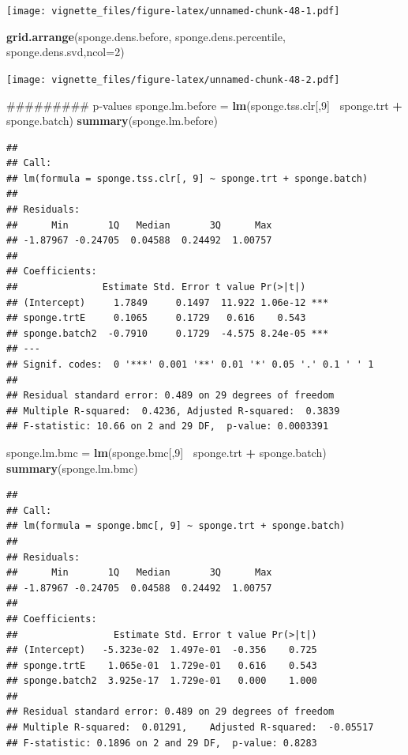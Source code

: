 \documentclass[]{book}
\newenvironment{Shaded}{\begin{snugshade}}{\end{snugshade}}
\newcommand{\KeywordTok}[1]{\textcolor[rgb]{0.13,0.29,0.53}{\textbf{#1}}}
\newcommand{\DataTypeTok}[1]{\textcolor[rgb]{0.13,0.29,0.53}{#1}}
\newcommand{\DecValTok}[1]{\textcolor[rgb]{0.00,0.00,0.81}{#1}}
\newcommand{\StringTok}[1]{\textcolor[rgb]{0.31,0.60,0.02}{#1}}
\newcommand{\OperatorTok}[1]{\textcolor[rgb]{0.81,0.36,0.00}{\textbf{#1}}}
\newcommand{\NormalTok}[1]{#1}
\begin{document}
\texttt{[image: vignette\_files/figure-latex/unnamed-chunk-48-1.pdf]}

\begin{Shaded}
\begin{Highlighting}[]
\KeywordTok{grid.arrange}\NormalTok{(sponge.dens.before, sponge.dens.percentile, sponge.dens.svd,}\DataTypeTok{ncol=}\DecValTok{2}\NormalTok{)}
\end{Highlighting}
\end{Shaded}

\texttt{[image: vignette\_files/figure-latex/unnamed-chunk-48-2.pdf]}

\begin{Shaded}
\begin{Highlighting}[]
\NormalTok{######### p-values}
\NormalTok{sponge.lm.before =}\StringTok{ }\KeywordTok{lm}\NormalTok{(sponge.tss.clr[,}\DecValTok{9}\NormalTok{]}\OperatorTok{~}\StringTok{ }\NormalTok{sponge.trt }\OperatorTok{+}\StringTok{ }\NormalTok{sponge.batch)}
\KeywordTok{summary}\NormalTok{(sponge.lm.before)}
\end{Highlighting}
\end{Shaded}

\begin{verbatim}
## 
## Call:
## lm(formula = sponge.tss.clr[, 9] ~ sponge.trt + sponge.batch)
## 
## Residuals:
##      Min       1Q   Median       3Q      Max 
## -1.87967 -0.24705  0.04588  0.24492  1.00757 
## 
## Coefficients:
##               Estimate Std. Error t value Pr(>|t|)    
## (Intercept)     1.7849     0.1497  11.922 1.06e-12 ***
## sponge.trtE     0.1065     0.1729   0.616    0.543    
## sponge.batch2  -0.7910     0.1729  -4.575 8.24e-05 ***
## ---
## Signif. codes:  0 '***' 0.001 '**' 0.01 '*' 0.05 '.' 0.1 ' ' 1
## 
## Residual standard error: 0.489 on 29 degrees of freedom
## Multiple R-squared:  0.4236, Adjusted R-squared:  0.3839 
## F-statistic: 10.66 on 2 and 29 DF,  p-value: 0.0003391
\end{verbatim}

\begin{Shaded}
\begin{Highlighting}[]
\NormalTok{sponge.lm.bmc =}\StringTok{ }\KeywordTok{lm}\NormalTok{(sponge.bmc[,}\DecValTok{9}\NormalTok{]}\OperatorTok{~}\StringTok{ }\NormalTok{sponge.trt }\OperatorTok{+}\StringTok{ }\NormalTok{sponge.batch)}
\KeywordTok{summary}\NormalTok{(sponge.lm.bmc)}
\end{Highlighting}
\end{Shaded}

\begin{verbatim}
## 
## Call:
## lm(formula = sponge.bmc[, 9] ~ sponge.trt + sponge.batch)
## 
## Residuals:
##      Min       1Q   Median       3Q      Max 
## -1.87967 -0.24705  0.04588  0.24492  1.00757 
## 
## Coefficients:
##                 Estimate Std. Error t value Pr(>|t|)
## (Intercept)   -5.323e-02  1.497e-01  -0.356    0.725
## sponge.trtE    1.065e-01  1.729e-01   0.616    0.543
## sponge.batch2  3.925e-17  1.729e-01   0.000    1.000
## 
## Residual standard error: 0.489 on 29 degrees of freedom
## Multiple R-squared:  0.01291,    Adjusted R-squared:  -0.05517 
## F-statistic: 0.1896 on 2 and 29 DF,  p-value: 0.8283
\end{verbatim}
\end{document}
